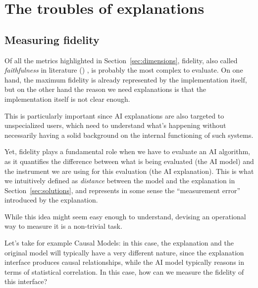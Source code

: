 \documentclass[conference]{IEEEtran}
\begin{document}
\section{The troubles of explanations}
\label{sec:troubles}

\subsection{Measuring fidelity}
\label{sec:fidelity}

Of all the metrics highlighted in Section~\ref{sec:dimensions}, fidelity, also
called \textit{faithfulness} in literature (\cite{explainingexpl}) , is
probably the most complex to evaluate. On one hand, the maximum fidelity is
already represented by the implementation itself, but on the other hand the
reason we need explanations is that the implementation itself is not clear
enough.

This is particularly important since AI explanations are also targeted to
unspecialized users, which need to understand what's happening without
necessarily having a solid background on the internal functioning of such
systems.

Yet, fidelity plays a fundamental role when we have to evaluate an AI algorithm,
as it quantifies the difference between what is being evaluated (the AI model)
and the instrument we are using for this evaluation (the AI explanation). This
is what we intuitively defined as \textit{distance} between the model and the
explanation in Section~\ref{sec:solutions}, and represents in some sense the
``measurement error'' introduced by the explanation.



While this idea might seem easy enough to understand, devising an operational
way to measure it is a non-trivial task.

Let's take for example Causal Models: in this case, the explanation and the
original model will typically have a very different nature, since the
explanation interface produces causal relationships, while the AI model
typically reasons in terms of statistical correlation. In this case, how can we
measure the fidelity of this interface?
\end{document}
